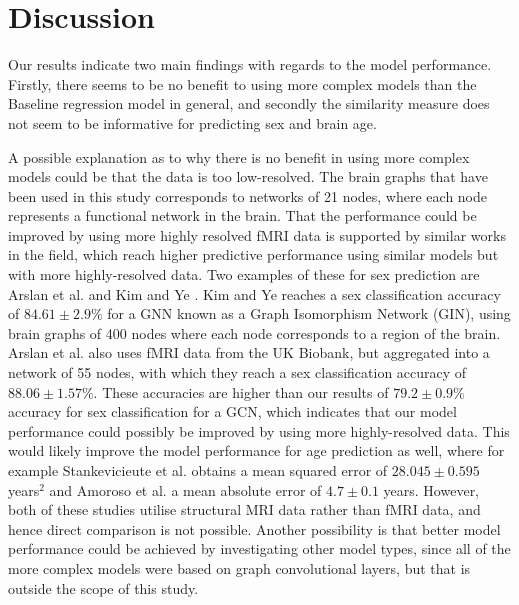 \chapter{Discussion}

    
Our results indicate two main findings with regards to the model performance. Firstly, there seems to be no benefit to using more complex models than the Baseline regression model in general, and secondly the similarity measure does not seem to be informative for predicting sex and brain age. 


A possible explanation as to why there is no benefit in using more complex models could be that the data is too low-resolved. The brain graphs that have been used in this study corresponds to networks of 21 nodes, where each node represents a functional network in the brain.  That the performance could be improved by using more highly resolved fMRI data is supported by similar works in the field, which reach higher predictive performance using similar models but with more highly-resolved data. Two examples of these for sex prediction are Arslan et al. \cite{arslan} and Kim and Ye \cite{understanding_gnn}. Kim and Ye reaches a sex classification accuracy of $84.61\pm2.9\%$ for a GNN known as a Graph Isomorphism Network (GIN), using brain graphs of 400 nodes where each node corresponds to a region of the brain. Arslan et al. also uses fMRI data from the UK Biobank, but aggregated into a network of 55 nodes, with which they reach a sex classification accuracy of $88.06\pm1.57\%$. These accuracies are higher than our results of $79.2\pm0.9\%$ accuracy for sex classification for a GCN, which indicates that our model performance could possibly be improved by using more highly-resolved data. This would likely improve the model performance for age prediction as well, where for example Stankevicieute et al. \cite{stankeviciute} obtains a mean squared error of $28.045\pm0.595$ years$^2$ and Amoroso et al. \cite{amoroso_multiplex_age} a mean absolute error of $4.7\pm0.1$ years. However, both of these studies utilise structural MRI data rather than fMRI data, and hence direct comparison is not possible. Another possibility is that better model performance could be achieved by investigating other model types, since all of the more complex models were based on graph convolutional layers, but that is outside the scope of this study. 

